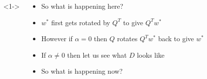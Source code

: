 \begin{frame}
\begin{columns}
		<1->
		\vspace{3em}
		\begin{overlayarea}{\textwidth}{\textheight}
			\begin{itemize}
				\item <1-> So what is happening here?
				\item <2->  $w^*$ first gets rotated by $Q^T$ to give $Q^Tw^*$
				\item <3->  However if $\alpha = 0$ then $Q$ rotates $Q^Tw^*$ back to give $w^*$
				\item <4->  If $\alpha \neq 0$ then let us see what $D$ looks like
				\item <17->  So what is happening now?
			\end{itemize}
		\end{overlayarea}
	\end{columns}
\end{frame}
	
